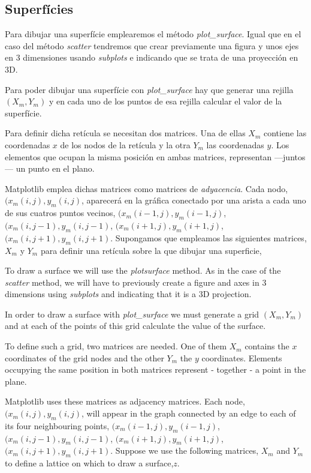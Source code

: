 \begin{paracol}{2}
\subsection{Superfícies}
Para dibujar una superfície emplearemos el método \textit{plot\_surface}. Igual que en el caso del método \textit{scatter} tendremos que crear previamente una figura y unos ejes en 3 dimensiones usando \textit{subplots} e indicando que se trata de una proyección en 3D.

Para poder dibujar una superfície con \textit{plot\_surface} hay que generar una rejilla $(X_m,Y_m)$ y en cada uno de los puntos de esa rejilla calcular el valor de la superfície.

Para definir dicha retícula  se necesitan dos matrices. Una de ellas $X_m$ contiene las coordenadas $x$ de los nodos de la retícula y la otra $Y_m$ las coordenadas $y$. Los elementos que ocupan la misma posición en ambas matrices, representan ---juntos--- un punto en el plano.

Matplotlib emplea dichas matrices como matrices de \emph{adyacencia}. Cada nodo, $(x_m(i,j),y_m(i,j)$, aparecerá en la gráfica conectado por una arista a cada uno de sus cuatros puntos vecinos, $(x_m(i-1,j),y_m(i-1,j)$, $(x_m(i,j-1),y_m(i,j-1)$, $(x_m(i+1,j),y_m(i+1,j)$, $(x_m(i,j+1),y_m(i,j+1)$.
Supongamos que empleamos las siguientes matrices, $X_m$ y $Y_m$ para definir una retícula sobre la que dibujar una superficie,

\switchcolumn

To draw a surface we will use the \textit{plot\-surface} method. As in the case of the \textit{scatter} method, we will have to previously create a figure and axes in 3 dimensions using \textit{subplots} and indicating that it is a 3D projection.

In order to draw a surface with \textit{plot\_surface} we must generate a grid $(X_m,Y_m)$ and at each of the points of this grid calculate the value of the surface.

To define such a grid, two matrices are needed. One of them $X_m$ contains the $x$ coordinates of the grid nodes and the other $Y_m$ the $y$ coordinates. Elements occupying the same position in both matrices represent - together - a point in the plane.

Matplotlib uses these matrices as adjacency matrices. Each node, $(x_m(i,j),y_m(i,j)$, will appear in the graph connected by an edge to each of its four neighbouring points, $(x_m(i-1,j),y_m(i-1,j)$, $(x_m(i,j-1),y_m(i,j-1)$, $(x_m(i+1,j),y_m(i+1,j)$, $(x_m(i,j+1),y_m(i,j+1)$.
Suppose we use the following matrices, $X_m$ and $Y_m$ to define a lattice on which to draw a surface,$z$.

\end{paracol}

